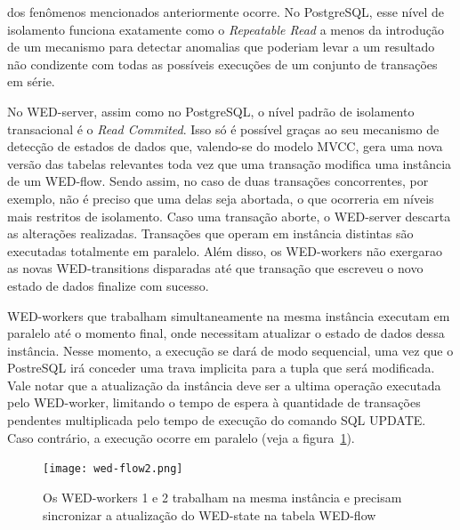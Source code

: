 \documentclass[conference]{IEEEtran}
\begin{document}
dos fenômenos mencionados anteriormente ocorre. No PostgreSQL, esse nível de isolamento funciona exatamente como o \emph{Repeatable Read}
a menos da introdução de um mecanismo para detectar anomalias que poderiam levar a um resultado não condizente com todas
as possíveis execuções de um conjunto de transações em série.
\par No WED-server, assim como no PostgreSQL, o nível padrão de isolamento transacional é o \emph{Read Commited}. Isso só
é possível graças ao seu mecanismo de detecção de estados de dados que, valendo-se do modelo MVCC, gera uma nova versão das
tabelas relevantes toda vez que uma transação modifica uma instância de um WED-flow. Sendo assim, no caso de duas transações 
concorrentes, por exemplo, não é preciso que uma delas seja abortada, o que ocorreria em níveis mais restritos de isolamento.
Caso uma transação aborte, o WED-server descarta as alterações realizadas. Transações que operam em instância distintas 
são executadas totalmente em paralelo. Além disso, os WED-workers não exergarao as novas WED-transitions 
disparadas até que transação que escreveu o novo estado de dados finalize com sucesso.
\par WED-workers que trabalham simultaneamente na mesma instância executam em paralelo até o momento final, onde necessitam
atualizar o estado de dados dessa instância. Nesse momento, a execução se dará de modo sequencial, uma vez que o PostreSQL
irá conceder uma trava implicita para a tupla que será modificada. Vale notar que a atualização da instância deve ser a 
ultima operação executada pelo WED-worker, limitando o tempo de espera à quantidade de transações pendentes multiplicada 
pelo tempo de execução do comando SQL UPDATE. Caso contrário, a execução ocorre em paralelo (veja a figura~\ref{fig_wf}).
   
\begin{figure}[!t]
\centering
\texttt{[image: wed-flow2.png]}
\caption{Os WED-workers 1 e 2 trabalham na mesma instância e precisam sincronizar a atualização do WED-state na tabela
WED-flow}
\label{fig_wf}
\end{figure}

\end{document}
